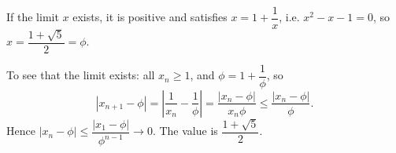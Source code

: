 If the limit $x$ exists, it is positive and satisfies $x=1+\dfrac1x$, i.e. $x^2-x-1=0$, so $x=\dfrac{1+\sqrt5}{2}=\phi$.

To see that the limit exists: all $x_n\ge1$, and $\phi=1+\dfrac1\phi$, so
\[\left|x_{n+1}-\phi\right|=\left|\dfrac1{x_n}-\dfrac1\phi\right|=\dfrac{\left|x_n-\phi\right|}{x_n\phi}\le\dfrac{\left|x_n-\phi\right|}{\phi}.\]
Hence $\left|x_n-\phi\right|\le\dfrac{\left|x_1-\phi\right|}{\phi^{n-1}}\to0$. The value is $\boxed{\dfrac{1+\sqrt5}{2}}$.
